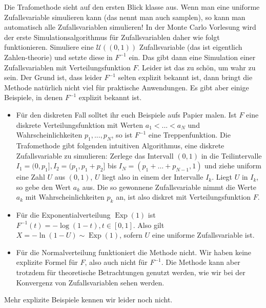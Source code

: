 Die Trafomethode sieht auf den ersten Blick klasse aus. Wenn man eine uniforme Zufallsvariable simulieren kann (das nennt man auch samplen), so kann man automatisch alle Zufallsvariablen simulieren! In der Monte Carlo Vorlesung wird der erste Simulationsalgorithmus f\"ur Zufallsvariablen daher wie folgt funktionieren. Simuliere eine $\mathcal U((0,1))$ Zufallsvariable (das ist eigentlich Zahlen-theorie) und setzte diese in $F^{-1}$ ein. Das gibt dann eine Simulation einer Zufallsvariablen mit Verteilungsfunktion $F$. Leider ist das zu sch\"on, um wahr zu sein. Der Grund ist, dass leider $F^{-1}$ selten explizit bekannt ist, dann bringt die Methode nat\"urlich nicht viel f\"ur praktische Anwendungen. Es gibt aber einige Beispiele, in denen $F^{-1}$ explizit bekannt ist. 
\begin{beispiel}  \abs

\begin{itemize}
	\item F\"ur den diskreten Fall solltet ihr euch Beispiele aufs Papier malen. Ist $F$ eine diskrete Verteilungsfunktion mit Werten $a_1<...<a_N$ und Wahrscheinlichkeiten $p_1,...,p_N$, so ist $F^{-1}$ eine Treppenfunktion. Die Trafomethode gibt folgenden intuitiven Algorithmus, eine diskrete Zufallsvariable zu simulieren: Zerlege das Intervall $(0,1)$ in die Teilintervalle $I_1=(0,p_1],I_2=(p_1,p_1+p_{2}]$ bis $I_N=(p_1+...+p_{N-1},1)$ und ziehe uniform eine Zahl $U$ aus $(0,1)$, $U$ liegt also in einem der Intervalle $I_k$. Liegt $U$ in $I_k$, so gebe den Wert $a_k$ aus. Die so gewonnene Zufallsvariable nimmt die Werte $a_k$ mit Wahrscheinlichkeiten $p_k$ an, ist also diskret mit Verteilungsfunktion $F$.
	\item F\"ur die Exponentialverteilung $\operatorname{Exp}(1)$ ist $F^{-1}(t)=-\log(1-t), t \in [0,1]$. Also gilt $X = - \ln(1-U) \sim \operatorname{Exp}(1)$, sofern $U$ eine uniforme Zufallsvariable ist.
	\item F\"ur die Normalverteilung funktioniert die Methode nicht. Wir haben keine explizite Formel f\"ur $F$, also auch nicht f\"ur $F^{-1}$. Die Methode kann aber trotzdem f\"ur theoretische Betrachtungen genutzt werden, wie wir bei der Konvergenz von Zufallsvariablen sehen werden.
\end{itemize}
\end{beispiel}
Mehr explizite Beispiele kennen wir leider noch nicht.
